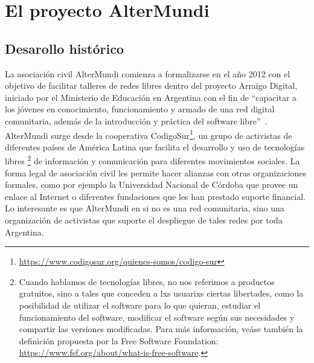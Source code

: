 \section{El proyecto AlterMundi}

\subsection{Desarollo histórico}

La asociación civil AlterMundi comienza a formalizarse en el año 2012 con el objetivo de facilitar talleres de redes libres dentro del proyecto Arraigo Digital, iniciado por el Ministerio de Educación en Argentina con el fin de ``capacitar a los jóvenes en conocimiento, funcionamiento y armado de una red digital comunitaria, además de la introducción y práctica del software libre''~\autocite{Picolli2015}.
AlterMundi surge desde la cooperativa CodigoSur\footnote{\url{https://www.codigosur.org/quienes-somos/codigo-sur}}, un grupo de activistas de diferentes países de América Latina que facilita el desarrollo y uso de tecnologías libres
\footnote{Cuando hablamos de tecnologías libres, no nos referimos a productos gratuitos, sino a tales que conceden a lxs usuarixs ciertas libertades, como la posibilidad de utilizar el software para lo que quieran, estudiar el funcionamiento del software, modificar el software según sus necesidades y compartir las versiones modificadas.
Para más información, veáse también la definición propuesta por la Free Software Foundation: \url{https://www.fsf.org/about/what-is-free-software}.}
de información y comunicación para diferentes movimientos sociales.
La forma legal de asociación civil les permite hacer alianzas con otras organizaciones formales, como por ejemplo la Universidad Nacional de Córdoba que provee un enlace al Internet o diferentes fundaciones que les han prestado suporte financial.
Lo interesante es que AlterMundi en si no es una red comunitaria, sino una organización de activistas que suporte el despliegue de tales redes por toda Argentina.

